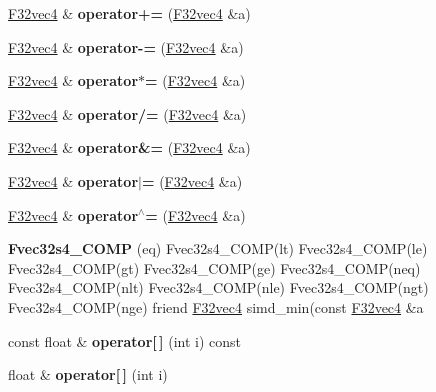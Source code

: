 \begin{DoxyCompactItemize}
\item 
\mbox{\label{class_f32vec4_aee4fa0dd0bd3628f0b7d41760c75a932}} 
\hyperlink{class_f32vec4}{F32vec4} \& {\bfseries operator+=} (\hyperlink{class_f32vec4}{F32vec4} \&a)
\item 
\mbox{\label{class_f32vec4_afbcf73c369019c5ab41317f3abd70327}} 
\hyperlink{class_f32vec4}{F32vec4} \& {\bfseries operator-\/=} (\hyperlink{class_f32vec4}{F32vec4} \&a)
\item 
\mbox{\label{class_f32vec4_a9fc3953cd73f02e41975f3c19c971ef1}} 
\hyperlink{class_f32vec4}{F32vec4} \& {\bfseries operator$\ast$=} (\hyperlink{class_f32vec4}{F32vec4} \&a)
\item 
\mbox{\label{class_f32vec4_aee4cd5bdae0a6e1d04a33851e1fe0e85}} 
\hyperlink{class_f32vec4}{F32vec4} \& {\bfseries operator/=} (\hyperlink{class_f32vec4}{F32vec4} \&a)
\item 
\mbox{\label{class_f32vec4_a25b14dd69507f20fe23e698a61689d22}} 
\hyperlink{class_f32vec4}{F32vec4} \& {\bfseries operator\&=} (\hyperlink{class_f32vec4}{F32vec4} \&a)
\item 
\mbox{\label{class_f32vec4_ab6b08d96c89525542c94f4a012e91f07}} 
\hyperlink{class_f32vec4}{F32vec4} \& {\bfseries operator$\vert$=} (\hyperlink{class_f32vec4}{F32vec4} \&a)
\item 
\mbox{\label{class_f32vec4_a65b02356024ee9a7ebf313268891f75b}} 
\hyperlink{class_f32vec4}{F32vec4} \& {\bfseries operator$^\wedge$=} (\hyperlink{class_f32vec4}{F32vec4} \&a)
\item 
\mbox{\label{class_f32vec4_a86f4a6d9ca47c62409c7867cb7c057e0}} 
{\bfseries Fvec32s4\+\_\+\+C\+O\+MP} (eq) Fvec32s4\+\_\+\+C\+O\+MP(lt) Fvec32s4\+\_\+\+C\+O\+MP(le) Fvec32s4\+\_\+\+C\+O\+MP(gt) Fvec32s4\+\_\+\+C\+O\+MP(ge) Fvec32s4\+\_\+\+C\+O\+MP(neq) Fvec32s4\+\_\+\+C\+O\+MP(nlt) Fvec32s4\+\_\+\+C\+O\+MP(nle) Fvec32s4\+\_\+\+C\+O\+MP(ngt) Fvec32s4\+\_\+\+C\+O\+MP(nge) friend \hyperlink{class_f32vec4}{F32vec4} simd\+\_\+min(const \hyperlink{class_f32vec4}{F32vec4} \&a
\item 
\mbox{\label{class_f32vec4_ae06878f783da6a6ba53d74f50d2f1605}} 
const float \& {\bfseries operator\mbox{[}$\,$\mbox{]}} (int i) const
\item 
\mbox{\label{class_f32vec4_aa3ad79634b50d708b169c0d974b340cb}} 
float \& {\bfseries operator\mbox{[}$\,$\mbox{]}} (int i)
\end{DoxyCompactItemize}
